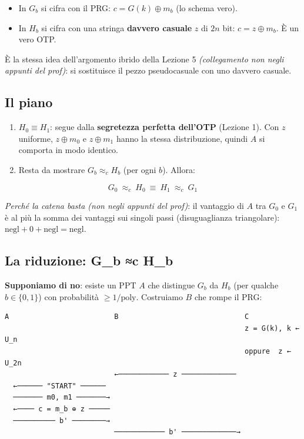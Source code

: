 \begin{itemize}
\tightlist
\item
  In \(G_b\) si cifra con il PRG: \(c = G(k) \oplus m_b\) (lo schema vero).
\item
  In \(H_b\) si cifra con una stringa \textbf{davvero casuale} \(z\) di \(2n\) bit: \(c = z \oplus m_b\). È un vero OTP.
\end{itemize}

È la stessa idea dell'argomento ibrido della Lezione 5 \emph{(collegamento non negli appunti del prof)}: si sostituisce il pezzo pseudocasuale con uno davvero casuale.

\subsection{Il piano}

\begin{enumerate}
\def\labelenumi{\arabic{enumi}.}
\tightlist
\item
  \(H_0 \equiv H_1\): segue dalla \textbf{segretezza perfetta dell'OTP} (Lezione 1). Con \(z\) uniforme, \(z \oplus m_0\) e \(z \oplus m_1\) hanno la stessa distribuzione, quindi \(A\) si comporta in modo identico.
\item
  Resta da mostrare \(G_b \approx_c H_b\) (per ogni \(b\)). Allora:
\end{enumerate}

\[
G_0 \ \approx_c\ H_0 \ \equiv\ H_1 \ \approx_c\ G_1
\]

\emph{Perché la catena basta (non negli appunti del prof)}: il vantaggio di \(A\) tra \(G_0\) e \(G_1\) è al più la somma dei vantaggi sui singoli passi (disuguaglianza triangolare): \(\text{negl} + 0 + \text{negl} = \text{negl}\).

\subsection{La riduzione: G\_b ≈c H\_b}

\textbf{Supponiamo di no}: esiste un PPT \(A\) che distingue \(G_b\) da \(H_b\) (per qualche \(b \in \{0, 1\}\)) con probabilità \(\ge 1/\text{poly}\). Costruiamo \(B\) che rompe il PRG:

\begin{verbatim}
A                         B                              C
                                                         z = G(k), k ← U_n
                                                         oppure  z ← U_2n
                          ←──────────── z ─────────────
  ←────── "START" ──────
  ─────── m0, m1 ───────→
  ←──── c = m_b ⊕ z ─────
  ────────── b' ────────→
                          ──────────── b' ─────────────→
\end{verbatim}

